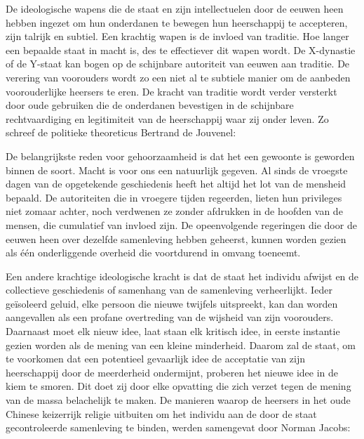 \documentclass[
  a5paper,
  smalldemyvopaper,10pt,twoside,onecolumn,openright,extrafontsizes,hidelinks]{memoir}
\renewenvironment{quote}%
               {\list{}{\rightmargin=.6cm\leftmargin=.6cm}%
                \itshape \item[]}%
               {\endlist}
\begin{document}
De ideologische wapens die de staat en zijn intellectuelen door de
eeuwen heen hebben ingezet om hun onderdanen te bewegen hun heerschappij
te accepteren, zijn talrijk en subtiel. Een krachtig wapen is de invloed
van traditie. Hoe langer een bepaalde staat in macht is, des te
effectiever dit wapen wordt. De X-dynastie of de Y-staat kan bogen op de
schijnbare autoriteit van eeuwen aan traditie. De verering van
voorouders wordt zo een niet al te subtiele manier om de aanbeden
voorouderlijke heersers te eren. De kracht van traditie wordt verder
versterkt door oude gebruiken die de onderdanen bevestigen in de
schijnbare rechtvaardiging en legitimiteit van de heerschappij waar zij
onder leven. Zo schreef de politieke theoreticus Bertrand de Jouvenel:

\begin{quote}
De belangrijkste reden voor gehoorzaamheid is dat het een gewoonte is
geworden binnen de soort. Macht is voor ons een natuurlijk gegeven. Al
sinds de vroegste dagen van de opgetekende geschiedenis heeft het altijd
het lot van de mensheid bepaald. De autoriteiten die in vroegere tijden
regeerden, lieten hun privileges niet zomaar achter, noch verdwenen ze
zonder afdrukken in de hoofden van de mensen, die cumulatief van invloed
zijn. De opeenvolgende regeringen die door de eeuwen heen over dezelfde
samenleving hebben geheerst, kunnen worden gezien als één onderliggende
overheid die voortdurend in omvang toeneemt.
\end{quote}

Een andere krachtige ideologische kracht is dat de staat het individu
afwijst en de collectieve geschiedenis of samenhang van de samenleving
verheerlijkt. Ieder geïsoleerd geluid, elke persoon die nieuwe twijfels
uitspreekt, kan dan worden aangevallen als een profane overtreding van
de wijsheid van zijn voorouders. Daarnaast moet elk nieuw idee, laat
staan elk kritisch idee, in eerste instantie gezien worden als de mening
van een kleine minderheid. Daarom zal de staat, om te voorkomen dat een
potentieel gevaarlijk idee de acceptatie van zijn heerschappij door de
meerderheid ondermijnt, proberen het nieuwe idee in de kiem te smoren.
Dit doet zij door elke opvatting die zich verzet tegen de mening van de
massa belachelijk te maken. De manieren waarop de heersers in het oude
Chinese keizerrijk religie uitbuiten om het individu aan de door de
staat gecontroleerde samenleving te binden, werden samengevat door
Norman Jacobs:
\end{document}
